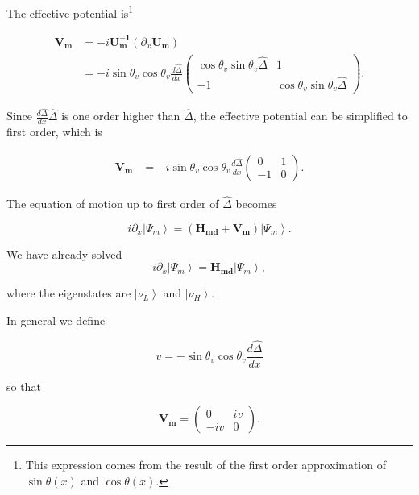 \documentclass{tufte-handout}
\newcommand{\ket}[1]{\left| #1\right\rangle}
\begin{document}
The effective potential is\footnote{This expression comes from the result of the first order approximation of $\sin\theta(x)$ and $\cos\theta(x)$.}

\begin{align*}
\mathbf{V_m} & = -i\mathbf{U_m^{-1}} ( \partial_x \mathbf{U_m} ) \\
& = - i\sin\theta_v \cos\theta_v \frac{d\hat\Delta}{dx} \begin{pmatrix}
\cos\theta_v\sin\theta_v \hat \Delta & 1 \\
-1 & \cos\theta_v \sin\theta_v \hat\Delta 
\end{pmatrix} .
\end{align*}

Since $\frac{d\hat\Delta}{dx} \hat\Delta$ is one order higher than $\hat\Delta$, the effective potential can be simplified to first order, which is

\begin{align*}
\mathbf{V_m} & = - i\sin\theta_v \cos\theta_v \frac{d\hat\Delta}{dx} \begin{pmatrix}
0 & 1 \\
-1 & 0
\end{pmatrix}.
\end{align*}

The equation of motion up to first order of $\hat\Delta$ becomes

\begin{equation*}
i\partial_x\ket{\Psi_m} = (\mathbf{H_{md}} + \mathbf{V_m})\ket{\Psi_m}.
\end{equation*}

We have already solved
\begin{equation*}
i\partial_x\ket{\Psi_m} = \mathbf{H_{md}} \ket{\Psi_m},
\end{equation*}

where the eigenstates are $\ket{\nu_L}$ and $\ket{\nu_H}$.


In general we define

\begin{equation*}
v = -\sin\theta_v \cos\theta_v\frac{d\hat\Delta}{dx}
\end{equation*}

so that

\begin{equation*}
\mathbf{V_m} = \begin{pmatrix}
0 & i v \\
-i v & 0
\end{pmatrix}.
\end{equation*}
\end{document}
